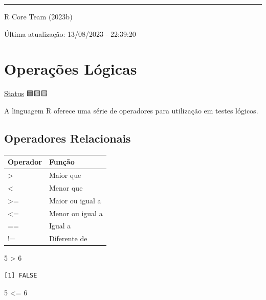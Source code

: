 \documentclass[
  letterpaper,
  DIV=11,
  numbers=noendperiod]{scrreprt}
\newenvironment{Shaded}{\begin{snugshade}}{\end{snugshade}}
\newcommand{\DecValTok}[1]{\textcolor[rgb]{0.68,0.00,0.00}{#1}}
\newcommand{\SpecialCharTok}[1]{\textcolor[rgb]{0.37,0.37,0.37}{#1}}
\begin{document}
\begin{center}\rule{0.5\linewidth}{0.5pt}\end{center}

R Core Team (2023b)

Última atualização: 13/08/2023 - 22:39:20

\hypertarget{operauxe7uxf5es-luxf3gicas}{%
\chapter{Operações Lógicas}\label{operauxe7uxf5es-luxf3gicas}}

\protect\hyperlink{status-do-material}{Status} 🟦🟨🟨

A linguagem R oferece uma série de operadores para utilização em testes
lógicos.

\hypertarget{operadores-relacionais}{%
\section{Operadores Relacionais}\label{operadores-relacionais}}

\begin{longtable}[]{@{}ll@{}}
\toprule()
Operador & Função \\
\midrule()
\endhead
\textgreater{} & Maior que \\
\textless{} & Menor que \\
\textgreater= & Maior ou igual a \\
\textless= & Menor ou igual a \\
== & Igual a \\
!= & Diferente de \\
\bottomrule()
\end{longtable}

\begin{Shaded}
\begin{Highlighting}[]
\DecValTok{5} \SpecialCharTok{\textgreater{}} \DecValTok{6}
\end{Highlighting}
\end{Shaded}

\begin{verbatim}
[1] FALSE
\end{verbatim}

\begin{Shaded}
\begin{Highlighting}[]
\DecValTok{5} \SpecialCharTok{\textless{}=} \DecValTok{6}
\end{Highlighting}
\end{Shaded}
\end{document}
